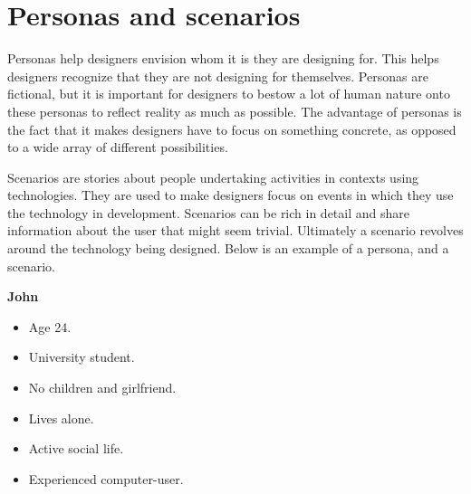 \section{Personas and scenarios}

Personas help designers envision whom it is they are designing for. This helps designers recognize that they are not designing for themselves. Personas are fictional, but it is important for designers to bestow a lot of human nature onto these personas to reflect reality as much as possible. The advantage of personas is the fact that it makes designers have to focus on something concrete, as opposed to a wide array of different possibilities.

Scenarios are stories about people undertaking activities in contexts using technologies. They are used to make designers focus on events in which they use the technology in development. Scenarios can be rich in detail and share information about the user that might seem trivial. Ultimately a scenario revolves around the technology being designed.\cite{Benyon10}
Below is an example of a persona, and a scenario.

\vspace{5 mm}
\noindent

\textbf{John}
\begin{itemize}
	\item Age 24.
	\item University student.
	\item No children and girlfriend.
	\item Lives alone.
	\item Active social life.
	\item Experienced computer-user.
\end{itemize}

